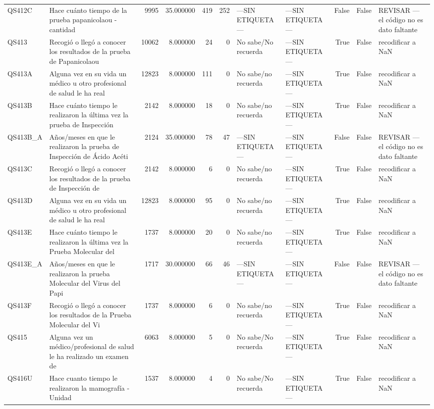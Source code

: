\begin{longtable}{llrrrrllrrl}
QS412C & Hace cuánto tiempo de la prueba papanicolaou - cantidad & 9995 & 35.000000 & 419 & 252 & —SIN ETIQUETA— & —SIN ETIQUETA— & False & False & REVISAR — el código no es dato faltante \\
QS413 & Recogió o llegó a  conocer los resultados de la prueba de Papanicolaou & 10062 & 8.000000 & 24 & 0 & No sabe/No recuerda & —SIN ETIQUETA— & True & False & recodificar a NaN \\
QS413A & Alguna vez en su vida un médico u otro profesional de salud le ha real & 12823 & 8.000000 & 111 & 0 & No sabe/no recuerda & —SIN ETIQUETA— & True & False & recodificar a NaN \\
QS413B & Hace cuánto tiempo le realizaron la última vez la prueba de Inspección & 2142 & 8.000000 & 18 & 0 & No sabe/no recuerda & —SIN ETIQUETA— & True & False & recodificar a NaN \\
QS413B\_A & Años/meses en que le realizaron la prueba de Inspección de Ácido Acéti & 2124 & 35.000000 & 78 & 47 & —SIN ETIQUETA— & —SIN ETIQUETA— & False & False & REVISAR — el código no es dato faltante \\
QS413C & Recogió o llegó a conocer los resultados de la prueba de Inspección de & 2142 & 8.000000 & 6 & 0 & No sabe/no recuerda & —SIN ETIQUETA— & True & False & recodificar a NaN \\
QS413D & Alguna vez en su vida un médico u otro profesional de salud le ha real & 12823 & 8.000000 & 95 & 0 & No sabe/no recuerda & —SIN ETIQUETA— & True & False & recodificar a NaN \\
QS413E & Hace cuánto tiempo le realizaron la última vez la Prueba Molecular del & 1737 & 8.000000 & 20 & 0 & No sabe/no recuerda & —SIN ETIQUETA— & True & False & recodificar a NaN \\
QS413E\_A & Años/meses en que le realizaron la prueba Molecular del Virus del Papi & 1717 & 30.000000 & 66 & 46 & —SIN ETIQUETA— & —SIN ETIQUETA— & False & False & REVISAR — el código no es dato faltante \\
QS413F & Recogió o llegó a conocer los resultados de la Prueba Molecular del Vi & 1737 & 8.000000 & 6 & 0 & No sabe/no recuerda & —SIN ETIQUETA— & True & False & recodificar a NaN \\
QS415 & Alguna vez un médico/profesional de salud le ha realizado un examen de & 6063 & 8.000000 & 5 & 0 & No sabe/No recuerda & —SIN ETIQUETA— & True & False & recodificar a NaN \\
QS416U & Hace cuanto tiempo le realizaron la mamografía - Unidad & 1537 & 8.000000 & 4 & 0 & No sabe/No recuerda & —SIN ETIQUETA— & True & False & recodificar a NaN \\

\end{longtable}
